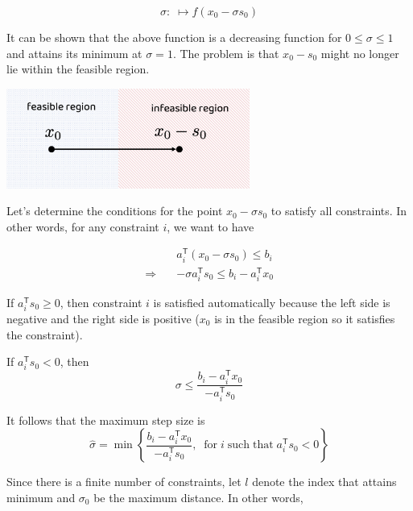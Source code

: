 \documentclass[letterpaper, oneside]{book}
\theoremstyle{definition}
\theoremstyle{remark}
\begin{document}
\begin{displaymath}
	\sigma: \; \mapsto f(x_0 - \sigma s_0)
\end{displaymath}

It can be shown that the above function is a decreasing function for $0 \leqslant \sigma \leqslant 1$ and attains its minimum at $\sigma = 1$. The problem is that $x_0 - s_0$ might no longer lie within the feasible region.


\begin{center}
	\includegraphics[width=0.6\textwidth]{search_direction.png}
\end{center}

Let's determine the conditions for the point $x_0 - \sigma s_0$ to satisfy all constraints. In other words, for any constraint $i$, we want to have

\begin{align*}
	& a_i^{\mathsf{T}}(x_0 - \sigma s_0) \leqslant b_i \\
	\Rightarrow \quad & -\sigma a_i^{\mathsf{T}} s_0 \leqslant b_i - a_i^{\mathsf{T}}x_0
\end{align*}

If $a_i^{\mathsf{T}}s_0 \ge 0$, then constraint $i$ is satisfied automatically because the left side is negative and the right side is positive ($x_0$ is in the feasible region so it satisfies the constraint). 

If $a_i^{\mathsf{T}}s_0 < 0$, then 
\begin{displaymath}
	\sigma \leqslant \frac{b_i - a_i^{\mathsf{T}}x_0}{-a_i^{\mathsf{T}}s_0}
\end{displaymath}

It follows that the maximum step size is
\begin{displaymath}
	\hat{\sigma} = \min \left\{ 
	\frac{b_i - a_i^{\mathsf{T}}x_0}{-a_i^{\mathsf{T}}s_0}, \;\; \mathrm{for}\; i \; \mathrm{such}\;\mathrm{that}\; a_i^{\mathsf{T}}s_0 < 0
	\right\} 
\end{displaymath}

Since there is a finite number of constraints, let $l$ denote the index that attains minimum and $\sigma_0$ be the maximum distance. In other words,
\end{document}
